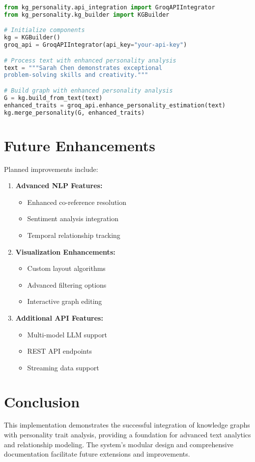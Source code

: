 \documentclass[11pt]{article}
\begin{document}
\begin{lstlisting}[language=Python, caption=Groq API Integration Example]
from kg_personality.api_integration import GroqAPIIntegrator
from kg_personality.kg_builder import KGBuilder

# Initialize components
kg = KGBuilder()
groq_api = GroqAPIIntegrator(api_key="your-api-key")

# Process text with enhanced personality analysis
text = """Sarah Chen demonstrates exceptional 
problem-solving skills and creativity."""

# Build graph with enhanced personality analysis
G = kg.build_from_text(text)
enhanced_traits = groq_api.enhance_personality_estimation(text)
kg.merge_personality(G, enhanced_traits)
\end{lstlisting}

\section{Future Enhancements}
Planned improvements include:

\begin{enumerate}
    \item \textbf{Advanced NLP Features:}
    \begin{itemize}
        \item Enhanced co-reference resolution
        \item Sentiment analysis integration
        \item Temporal relationship tracking
    \end{itemize}
    
    \item \textbf{Visualization Enhancements:}
    \begin{itemize}
        \item Custom layout algorithms
        \item Advanced filtering options
        \item Interactive graph editing
    \end{itemize}
    
    \item \textbf{Additional API Features:}
    \begin{itemize}
        \item Multi-model LLM support
        \item REST API endpoints
        \item Streaming data support
    \end{itemize}
\end{enumerate}

\section{Conclusion}
This implementation demonstrates the successful integration of knowledge graphs with personality trait analysis, providing a foundation for advanced text analytics and relationship modeling. The system's modular design and comprehensive documentation facilitate future extensions and improvements.
\end{document}
